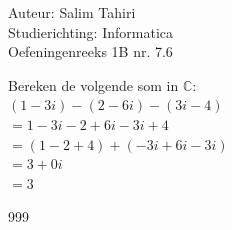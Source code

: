 \documentclass[a4paper]{article}
\newcommand{\C}{\mathbb{C}}
\begin{document}
  
\noindent \large Auteur: Salim Tahiri \\
\noindent \large Studierichting: Informatica\\
\noindent \large Oefeningenreeks 1B nr. 7.6\\
  
\normalsize

Bereken de volgende som in $\C$:\\
  
$(1 - 3i) - (2 - 6i) - (3i - 4)$\\
  
$= 1 - 3i - 2 + 6i - 3i + 4$\\
  
$= (1 - 2 + 4) + (-3i + 6i - 3i)$\\
  
$= 3 + 0i$\\
  
$= 3$\\
  
\begin{thebibliography}{999}
\end{thebibliography}
\end{document}
